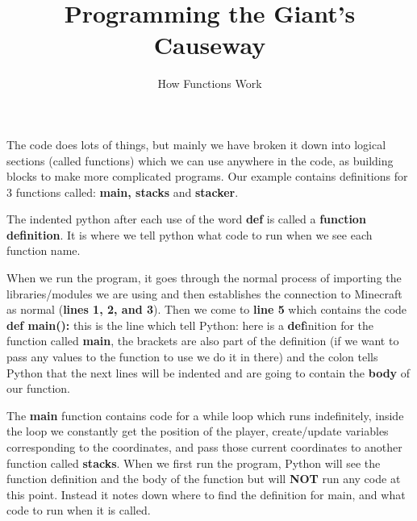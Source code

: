 \documentclass{geocraft-worksheet-multipage}
\begin{document}
\title{Programming the Giant's Causeway}
\subtitle{How Functions Work}

\date{}
\maketitle


\lstset{language=Python}

\noindent%
%

%
%
\vspace{0.2cm}

The code does lots of things, but mainly we have broken it down into
logical sections (called functions) which we can use anywhere in the
code, as building blocks to make more complicated programs. Our
example contains definitions for 3 functions called: \textbf{main,
  stacks} and \textbf{stacker}. \vspace{0.5cm}


The indented python after each use of the word \textbf{def} is called
a \textbf{function definition}. It is where we tell python what code to run
when we see each function name.  \vspace{0.5cm}


When we run the program, it goes through the normal process of
importing the libraries/modules we are using and then establishes the
connection to Minecraft as normal (\textbf{lines 1, 2, and 3}). Then
we come to \textbf{line 5} which contains the code 
\textbf{def main():} this is the line which tell Python: here is a
\textbf{def}inition for the function called \textbf{main}, the
brackets are also part of the definition (if we want to pass any
values to the function to use we do it in there) and the colon tells
Python that the next lines will be indented and are going to contain
the \textbf{body} of our function. \vspace{0.5cm}


The \textbf{main} function contains code for a while loop which runs
indefinitely, inside the loop we constantly get the position of the
player, create/update variables corresponding to the coordinates, and
pass those current coordinates to another function called
\textbf{stacks}. When we first run the program, Python will see the
function definition and the body of the function but will \textbf{NOT}
run any code at this point. Instead it notes down where to find the
definition for main, and what code to run when it is
called. \vspace{0.5cm}
\end{document}
